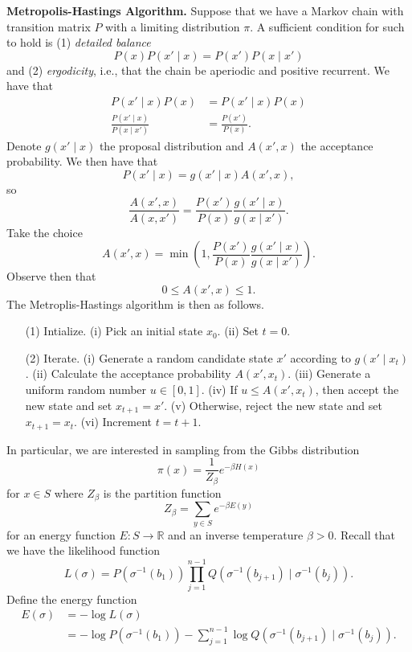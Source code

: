 \documentclass{article}
\begin{document}
\textbf{Metropolis-Hastings Algorithm.} Suppose that we have a Markov chain with transition matrix $P$ with a limiting distribution $\pi$. A sufficient condition for such to hold is (1) \textit{detailed balance} 
$$P(x) P(x' \mid x) = P(x') P(x \mid x')$$
and (2) \textit{ergodicity}, i.e., that the chain be aperiodic and positive recurrent. We have that 
\begin{align*}
    P(x' \mid x) P(x) &= P(x' \mid x) P(x) \\
    \frac{P(x' \mid x)}{P(x \mid x')} &= \frac{P(x')}{P(x)}.
\end{align*}
Denote $g(x' \mid x)$ the proposal distribution and $A(x', x)$ the acceptance probability. We then have that 
$$P(x' \mid x) = g(x' \mid x) A(x', x),$$
so 
$$\frac{A(x', x)}{A(x, x')} = \frac{P(x')}{P(x)} \frac{g(x' \mid x)}{g(x \mid x')}.$$
Take the choice 
$$A(x', x) = \min\left(1, \frac{P(x')}{P(x)} \frac{g(x' \mid x)}{g(x \mid x')}\right).$$
Observe then that 
$$0 \leq A(x', x) \leq 1.$$
The Metroplis-Hastings algorithm is then as follows.
\begin{enumerate}
\item[(1)] Intialize.
\subitem(i) Pick an initial state $x_{0}$.
\subitem(ii) Set $t = 0$.
\item[(2)] Iterate.
\subitem(i) Generate a random candidate state $x'$ according to $g(x' \mid x_{t})$.
\subitem(ii) Calculate the acceptance probability $A(x', x_{t})$.
\subitem(iii) Generate a uniform random number $u \in [0, 1]$.
\subitem(iv) If $u \leq A(x', x_{t})$, then accept the new state and set $x_{t+1} = x'$.
\subitem(v) Otherwise, reject the new state and set $x_{t+1} = x_{t}$.
\subitem(vi) Increment $t = t+1$.
\end{enumerate}
In particular, we are interested in sampling from the Gibbs distribution 
$$\pi(x) = \frac{1}{Z_{\beta}} e^{-\beta H(x)}$$
for $x \in S$ where $Z_{\beta}$ is the partition function 
$$Z_{\beta} = \sum_{y \in S} e^{-\beta E(y)}$$
for an energy function $E: S \to \mathbb{R}$ and an inverse temperature $\beta > 0$. Recall that we have the likelihood function 
$$L(\sigma) = P(\sigma^{-1}(b_{1}))\prod_{j=1}^{n-1}Q(\sigma^{-1}(b_{j+1}) \mid \sigma^{-1}(b_{j})).$$
Define the energy function 
\begin{align*}
    E(\sigma) &= -\log L(\sigma) \\
    &= -\log P(\sigma^{-1}(b_{1})) - \sum_{j=1}^{n-1} \log Q(\sigma^{-1}(b_{j+1}) \mid \sigma^{-1}(b_{j})).
\end{align*}
\end{document}
